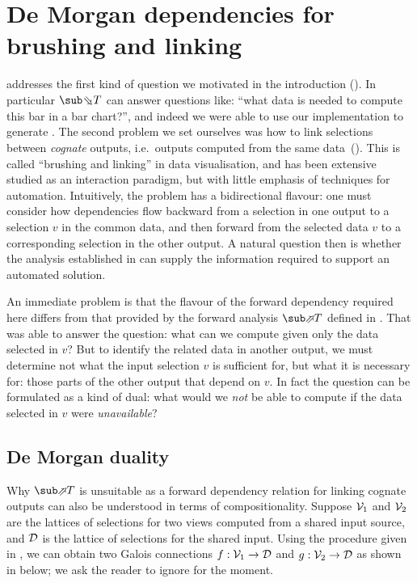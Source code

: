 \newpage
\section{De Morgan dependencies for brushing and linking}
\label{sec:de-morgan}

 addresses the first kind of question we motivated in the introduction (). In particular $\evalBwdF{T}$ can answer questions like: ``what data is needed to compute this bar in a bar chart?'', and indeed we were able to use our implementation to generate . The second problem we set ourselves was how to link selections between \emph{cognate} outputs, i.e.~outputs computed from the same data~(). This is called ``brushing and linking'' \cite{becker87} in data visualisation, and has been extensive studied as an interaction paradigm, but with little emphasis of techniques for automation. Intuitively, the problem has a bidirectional flavour: one must consider how dependencies flow backward from a selection in one output to a selection $v$ in the common data, and then forward from the selected data $v$ to a corresponding selection in the other output. A natural question then is whether the analysis established in  can supply the information required to support an automated solution.

An immediate problem is that the flavour of the forward dependency required here differs from that provided by the forward analysis $\evalFwdF{T}$ defined in . That was able to answer the question: what can we compute given only the data selected in $v$? But to identify the related data in another output, we must determine not what the input selection $v$ is sufficient for, but what it is necessary for: those parts of the other output that depend on $v$. In fact the question can be formulated as a kind of dual: what would we \emph{not} be able to compute if the data selected in $v$ were \emph{unavailable}?

\subsection{De Morgan duality}
\label{sec:de-morgan:de-morgan-duality}

Why $\evalFwdF{T}$ is unsuitable as a forward dependency relation for linking cognate outputs can also be understood in terms of compositionality. Suppose $\mathcal{V}_1$ and $\mathcal{V}_2$ are the lattices of selections for two views computed from a shared input source, and $\mathcal{D}$ is the lattice of selections for the shared input. Using the procedure given in , we can obtain two Galois connections $f: \mathcal{V}_1 \to \mathcal{D}$ and $g: \mathcal{V}_2 \to \mathcal{D}$ as shown in  below; we ask the reader to ignore  for the moment.

